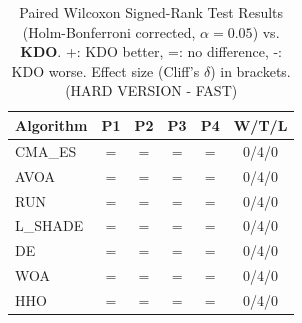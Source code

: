\begin{table}[htbp]
\centering
\caption{Paired Wilcoxon Signed-Rank Test Results (Holm-Bonferroni corrected, $\alpha=0.05$) vs. \textbf{KDO}. +: KDO better, =: no difference, -: KDO worse. Effect size (Cliff's $\delta$) in brackets. (HARD VERSION - FAST)}
\label{tab:wilcoxon_advanced}
\small
\begin{tabular}{lccccc}
\toprule
\textbf{Algorithm} & \textbf{P1} & \textbf{P2} & \textbf{P3} & \textbf{P4} & \textbf{W/T/L} \\
\midrule
CMA_ES & $=$ & $=$ & $=$ & $=$ & 0/4/0 \\
AVOA & $=$ & $=$ & $=$ & $=$ & 0/4/0 \\
RUN & $=$ & $=$ & $=$ & $=$ & 0/4/0 \\
L_SHADE & $=$ & $=$ & $=$ & $=$ & 0/4/0 \\
DE & $=$ & $=$ & $=$ & $=$ & 0/4/0 \\
WOA & $=$ & $=$ & $=$ & $=$ & 0/4/0 \\
HHO & $=$ & $=$ & $=$ & $=$ & 0/4/0 \\
\bottomrule
\end{tabular}
\end{table}
